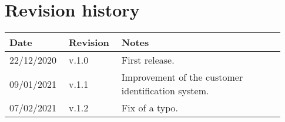 \chapter*{Revision history}

\begin{center}
	\begin{tabular}{@{}p{0.18\linewidth} p{0.18\linewidth} p{0.57\linewidth}@{}}
		\toprule
		\textbf{Date} & \textbf{Revision} & \textbf{Notes}\\
		\midrule
		22/12/2020 & v.1.0 & First release.\\
		09/01/2021 & v.1.1 & Improvement of the customer identification system.\\
		07/02/2021 & v.1.2 & Fix of a typo.\\
		\bottomrule
	\end{tabular}
\end{center}